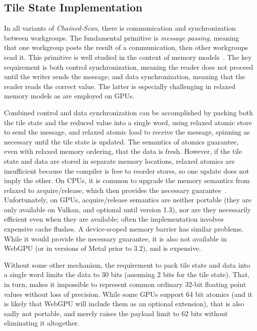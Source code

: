 \documentclass[sigconf]{acmart}
\begin{document}
\subsection{Tile State Implementation}
In all variants of \emph{Chained-Scan}, there is communication and synchronization between workgroups. The fundamental primitive is \emph{message passing,} meaning that one workgroup posts the result of a communication, then other workgroups read it. This primitive is well studied in the context of memory models~\cite{Alglave0, MCMutants}. The key requirement is both control synchronization, meaning the reader does not proceed until the writer sends the message; and data synchronization, meaning that the reader reads the correct value. The latter is especially challenging in relaxed memory models as are employed on GPUs.

Combined control and data synchronization can be accomplished by packing both the tile state and the reduced value into a single word, using relaxed atomic store to send the message, and relaxed atomic load to receive the message, spinning as necessary until the tile state is updated. The semantics of atomics guarantee, even with relaxed memory ordering, that the data is fresh. However, if the tile state and data are stored in separate memory locations, relaxed atomics are insufficient because the compiler is free to reorder stores, so one update does not imply the other. On CPUs, it is common to upgrade the memory semantics from relaxed to acquire/release, which then provides the necessary guarantee~\cite[Section 10.2]{intel_sdm_2024}. Unfortunately, on GPUs, acquire/release semantics are neither portable (they are only available on Vulkan, and optional until version 1.3), nor are they necessarily efficient even when they are available; often the implementation involves expensive cache flushes. A device-scoped memory barrier has similar problems. While it would provide the necessary guarantee, it is also not available in WebGPU (or in versions of Metal prior to 3.2), and is expensive.

Without some other mechanism, the requirement to pack tile state and data into a single word limits the data to 30 bits (assuming 2 bits for the tile state). That, in turn, makes it impossible to represent common ordinary 32-bit floating point values without loss of precision. While some GPUs support 64 bit atomics (and it is likely that WebGPU will include them as an optional extension), that is also sadly not portable, and merely raises the payload limit to 62 bits without eliminating it altogether.
\end{document}
